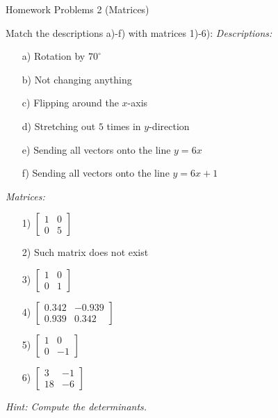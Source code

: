  \begin{center}\begin{large} Homework Problems 2 (Matrices) \end{large}\end{center}
 \bigskip




\begin{problem}
Match the descriptions a)-f) with matrices 1)-6):
\smallskip 
\textit{Descriptions:} 

\begin{enumerate}
    \item[a) ] Rotation by $70^\circ$
    \item[b) ] Not changing anything
    \item[c) ] Flipping around the $x$-axis
    \item[d) ] Stretching out $5$ times in $y$-direction
    \item[e) ] Sending all vectors onto the line $y=6x$
    \item[f) ] Sending all vectors onto the line $y=6x+1$
\end{enumerate}

\textit{Matrices:} 

\begin{enumerate}
    \item[1) ] $\begin{bmatrix}
        1&0\\0&5
    \end{bmatrix}$
    \item[2) ] Such matrix does not exist
    \item[3) ] $\begin{bmatrix}
        1&0\\0&1
    \end{bmatrix}$
    \item[4) ] $\begin{bmatrix}
        0.342 & -0.939\\
         0.939& 0.342
    \end{bmatrix}$
    \item[5) ] $\begin{bmatrix}
        1&0\\0&-1
    \end{bmatrix}$
    \item[6) ] $\begin{bmatrix}
        3&-1\\18&-6
    \end{bmatrix}$
\end{enumerate}

{\small \textit{Hint: Compute the determinants.}
    }
\end{problem}

